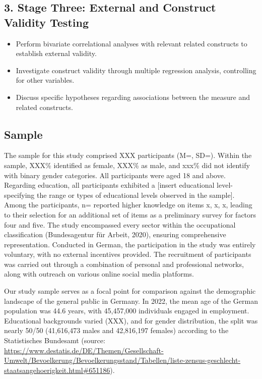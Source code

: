 \documentclass[
  12pt,
  a4paper,
  twoside]{article}
\providecommand{\tightlist}{%
  \setlength{\itemsep}{0pt}\setlength{\parskip}{0pt}}
\begin{document}
\hypertarget{stage-three-external-and-construct-validity-testing}{%
\subsection{3. Stage Three: External and Construct Validity Testing}\label{stage-three-external-and-construct-validity-testing}}

\begin{itemize}
\tightlist
\item
  Perform bivariate correlational analyses with relevant related constructs to establish external validity.
\item
  Investigate construct validity through multiple regression analysis, controlling for other variables.
\item
  Discuss specific hypotheses regarding associations between the measure and related constructs.
\end{itemize}

\hypertarget{sample}{%
\subsection{Sample}\label{sample}}

The sample for this study comprised XXX participants (M=, SD=). Within the sample, XXX\% identified as female, XXX\% as male, and xxx\% did not identify with binary gender categories. All participants were aged 18 and above. Regarding education, all participants exhibited a {[}insert educational level- specifying the range or types of educational levels observed in the sample{]}. Among the participants, n= reported higher knowledge on items x, x, x, leading to their selection for an additional set of items as a preliminary survey for factors four and five.
The study encompassed every sector within the occupational classification (Bundesagentur für Arbeit, 2020), ensuring comprehensive representation. Conducted in German, the participation in the study was entirely voluntary, with no external incentives provided. The recruitment of participants was carried out through a combination of personal and professional networks, along with outreach on various online social media platforms.

Our study sample serves as a focal point for comparison against the demographic landscape of the general public in Germany. In 2022, the mean age of the German population was 44.6 years, with 45,457,000 individuals engaged in employment. Educational backgrounds varied (XXX), and for gender distribution, the split was nearly 50/50 (41,616,473 males and 42,816,197 females) according to the Statistisches Bundesamt (source: \url{https://www.destatis.de/DE/Themen/Gesellschaft-Umwelt/Bevoelkerung/Bevoelkerungsstand/Tabellen/liste-zensus-geschlecht-staatsangehoerigkeit.html\#651186}).
\end{document}
